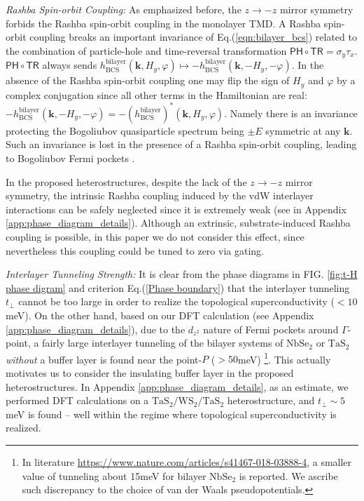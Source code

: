 \vspace{1em}
\emph{Rashba Spin-orbit Coupling:} As emphasized before, the $z\rightarrow-z$ mirror symmetry forbids the Rashba spin-orbit coupling in the monolayer TMD. A Rashba spin-orbit coupling breaks an important invariance of Eq.(\ref{eqn:bilayer_bcs}) related to the combination of particle-hole and time-reversal transformation $\mathsf{PH}\circ\mathsf{TR}=\sigma_y\tau_x$. $\mathsf{PH}\circ\mathsf{TR}$ always sends $h_{\text{BCS}}^{\text{bilayer}}(\bm{k},H_y,\varphi)\mapsto -h_{\text{BCS}}^{\text{bilayer}}(\bm{k},-H_y,-\varphi)$. In the absence of the Rashba spin-orbit coupling one may flip the sign of $H_y$ and $\varphi$ by a complex conjugation since all other terms in the Hamiltonian are real: $-h_{\text{BCS}}^{\text{bilayer}}(\bm{k},-H_y,-\varphi)=-(h_{\text{BCS}}^{\text{bilayer}})^*(\bm{k},H_y,\varphi)$. Namely there is an invariance protecting the Bogoliubov quasiparticle spectrum being $\pm E$ symmetric at any $\bm k$. Such an invariance is lost in the presence of a Rashba spin-orbit coupling, leading to Bogoliubov Fermi pockets \cite{shaffer2020crystalline}.

In the proposed heterostructures, despite the lack of the $z\rightarrow-z$ mirror symmetry, the intrinsic Rashba coupling induced by the vdW interlayer interactions can be safely neglected since it is extremely weak (see in Appendix \ref{app:phase_diagram_details}). Although an extrinsic, substrate-induced Rashba coupling is possible, in this paper we do not consider this effect, since nevertheless this coupling could be tuned to zero via gating.

\vspace{1em}
\emph{Interlayer Tunneling Strength:} It is clear from the phase diagrams in FIG. \ref{fig:t-H phase digram} and criterion Eq.(\ref{Phase boundary}) that the interlayer tunneling $t_\perp$ cannot be too large in order to realize the topological superconductivity ($<10$meV). On the other hand, based on our DFT calculation (see Appendix \ref{app:phase_diagram_details}), due to the $d_{z^2}$ nature of Fermi pockets around $\Gamma$-point, a fairly large interlayer tunneling of the bilayer systems of $\mathrm{NbSe_2}$ or $\mathrm{TaS_2}$ \emph{without} a buffer layer is found near the point-$P$ ($>50$meV) \footnote{In literature \protect\url{https://www.nature.com/articles/s41467-018-03888-4}, a smaller value of tunneling about 15meV for bilayer $\mathrm{NbSe_2}$ is reported. We ascribe such discrepancy to the choice of van der Waals pseudopotentials.}. This actually motivates us to consider the insulating buffer layer in the proposed heterostructures. In Appendix \ref{app:phase_diagram_details}, as an estimate, we performed DFT calculations on a $\mathrm{TaS_2}/\mathrm{WS_2}/\mathrm{TaS_2}$ heterostructure, and $t_\perp\sim 5$meV is found -- well within the regime where topological superconductivity is realized.

